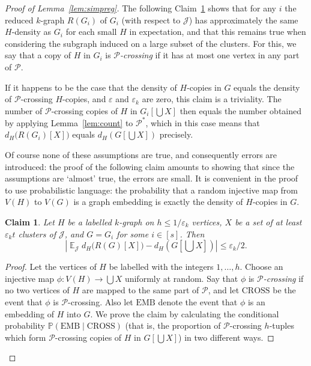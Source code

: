 \documentclass[12pt,a4paper]{amsart}
\let\eps\varepsilon
\newtheorem{claim}[theorem] {Claim}
\newcommand{\oldqed}{}
\def\endofClaim{\hfill\scalebox{.6}{$\Box$}}
\newenvironment{claimproof}[1][Proof]{
  \renewcommand{\oldqed}{\qedsymbol}
  \renewcommand{\qedsymbol}{\endofClaim}
  \begin{proof}[#1]
}{
  \end{proof}
  \renewcommand{\qedsymbol}{\oldqed}
}
\newcommand{\Prob}{\mathbb{P}}
\newcommand{\Exp}{\mathop{\mathbb{E}}}
\newcommand{\cJ}{\mathcal{J}}
\newcommand{\Part}{\mathcal{P}}
\newcommand{\HOM}{\text{EMB}}
\newcommand{\CROSS}{\mathrm{CROSS}}
\begin{document}
\begin{proof}[Proof of Lemma~\ref{lem:simpreg}]
The following Claim~\ref{lem:expect} shows that for any $i$ the reduced
$k$-graph $R(G_i)$ of $G_i$ (with respect to $\cJ$) has approximately the same
$H$-density as $G_i$ for each small $H$ in expectation, and that this remains
true when considering the subgraph induced on a large subset of the clusters.
For this, we say that a copy of $H$ in $G_i$ is \emph{$\Part$-crossing} if it
has at most one vertex in any part of $\Part$.

If it happens to be the case that the density of $H$-copies in $G$ equals
the density of $\Part$-crossing $H$-copies, and $\eps$ and $\eps_k$ are zero,
this claim is a triviality. The number of $\Part$-crossing copies of $H$ in 
$G_i[\bigcup X]$ then equals the number obtained by applying
Lemma~\ref{lem:count} to $\Part^*$, which in this case means that $d_H\big(R(G_i)[X]\big)$
equals $d_H\left(G \left[\bigcup X \right]\right)$ precisely.

Of course none of these assumptions
are true, and consequently errors are introduced: the proof of the following
claim amounts to showing that since the assumptions are `almost' true, the
errors are small. It is convenient in the proof to use probabilistic language:
the probability that a random injective map from $V(H)$ to $V(G)$ is a graph embedding is exactly the density of $H$-copies in $G$.

\begin{claim}\label{lem:expect}
Let $H$ be a labelled $k$-graph on $h \leq 1/\eps_k$ vertices, $X$ be a set of
at least $\eps_k t$ clusters of $\cJ$, and $G = G_i$ for some $i \in [s]$. Then 
$$\left| \Exp_\cJ d_H\big(R(G)[X]\big) - d_H\left(G \left[\bigcup X \right]\right)\right| \leq \eps_k/2.$$
\end{claim}

\begin{claimproof}
Let the vertices of $H$ be labelled with the integers $1, \dots, h$.
Choose an injective map $\phi : V(H) \to \bigcup X$ uniformly at random. Say
that $\phi$ is \emph{$\Part$-crossing} if no two vertices of $H$ are mapped to the same
part of $\Part$, and let $\CROSS$ be the event that $\phi$ is $\Part$-crossing.
Also let $\HOM$ denote the event that $\phi$ is an embedding of $H$ into $G$.
We prove the claim by calculating the conditional probability $\Prob(\HOM
\mid \CROSS)$ (that is, the proportion of $\Part$-crossing $h$-tuples which form $\Part$-crossing copies of $H$ in $G[\bigcup X]$) in two different ways.


\end{claimproof}
\end{proof}
\end{document}
